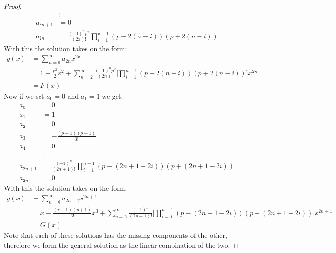 \documentclass[12pt, letterpaper, onecolumn, conference, final]{IEEEtran}
\theoremstyle{definition}
\newtheorem{proposition}{Proposition}
\theoremstyle{plain}
\begin{document}
\begin{proof}
\begin{equation*}
\begin{split}
&\vdots \\
a_{2n + 1} &= 0 \\
a_{2n} &= \frac{(-1)^np^2}{(2n)!}\prod_{i = 1}^{n - 1} (p - 2(n - i))(p + 2(n - i))
\end{split}
\end{equation*}
With this the solution takes on the form:
\begin{equation*}
\begin{split}
y(x) &= \sum_{n = 0}^\infty a_{2n}x^{2n} \\
&= 1 - \frac{p^2}{2}x^2 + \sum_{n = 2}^\infty \frac{(-1)^np^2}{(2n)!} \Bigg[ \prod_{i = 1}^{n - 1} (p - 2(n - i))(p + 2(n - i)) \Bigg] x^{2n} \\
&= F(x)
\end{split}
\end{equation*}
Now if we set $a_0 = 0$ and $a_1 = 1$ we get:
\begin{equation*}
\begin{split}
a_0 &= 0 \\
a_1 &= 1 \\
a_2 &= 0 \\
a_3 &= -\frac{(p - 1)(p + 1)}{3!} \\
a_4 &= 0 \\
&\vdots \\
a_{2n + 1} &= \frac{(-1)^n}{(2n + 1)!}\prod_{i = 1}^{n - 1} (p - (2n + 1 - 2i))(p + (2n + 1 - 2i)) \\
a_{2n} &= 0
\end{split}
\end{equation*}
With this the solution takes on the form:
\begin{equation*}
\begin{split}
y(x) &= \sum_{n = 0}^\infty a_{2n + 1}x^{2n + 1} \\
&= x - \frac{(p - 1)(p + 1)}{3!}x^3 + \sum_{n = 2}^\infty \frac{(-1)^n}{(2n + 1)!} \Bigg[ \prod_{i = 1}^{n - 1} (p - (2n + 1 - 2i))(p + (2n + 1 - 2i)) \Bigg] x^{2n + 1} \\
&= G(x)
\end{split}
\end{equation*}
Note that each of these solutions has the missing components of the other, therefore we form the general solution as the linear combination of the two.
\end{proof}

\begin{center}
\end{center}
\end{document}
